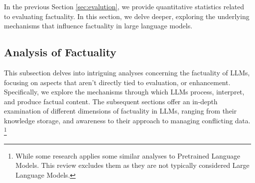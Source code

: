 


In the previous Section \ref{sec:evalution}, we provide quantitative statistics related to evaluating factuality. In this section, we delve deeper, exploring the underlying mechanisms that influence factuality in large language models.
\subsection{Analysis of Factuality}
\label{sec:factuality_analysis}
This subsection delves into intriguing analyses concerning the factuality of LLMs, focusing on aspects that aren't directly tied to evaluation, or enhancement. Specifically, we explore the mechanisms through which LLMs process, interpret, and produce factual content. The subsequent sections offer an in-depth examination of different dimensions of factuality in LLMs, ranging from their knowledge storage, and awareness to their approach to managing conflicting data. 
\footnote{
While some research \citep{wang-etal-2021-generative,neeman-etal-2023-disentqa} applies some similar analyses to Pretrained Language Models. This review excludes them as they are not typically considered Large Language Models.}


